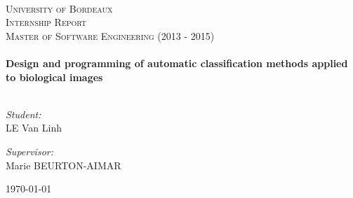 \begin{titlepage}
\begin{center}
\\[2cm]
\textsc{\LARGE University of Bordeaux} \\[1.5cm]
\textsc{\Large Internship Report}\\[1cm]
\textsc{\Large Master of Software Engineering (2013 - 2015)}\\[1cm]
\HRule
\\[0.3cm]
\huge \bfseries Design and programming of automatic classification methods applied to biological images
\\[0.3cm]
\HRule
\\[2cm]
\noindent 
\begin{minipage}{0.4\textwidth}
\begin{flushleft} \large
\emph{Student:}\\
\textsc{LE} Van Linh 
\end{flushleft}
\end{minipage}%
\begin{minipage}{0.6\textwidth}
\begin{flushright} \large
\emph{Supervisor:} \\
Marie \textsc{BEURTON-AIMAR} \\
\end{flushright}
\end{minipage}

\vfill
{\large \today}
\end{center}
\end{titlepage}
